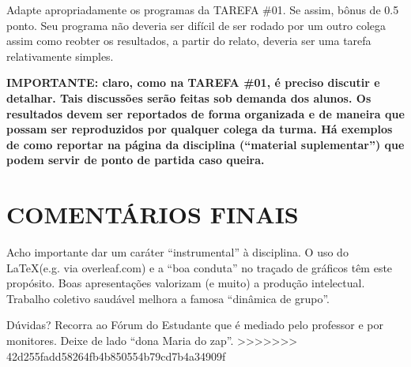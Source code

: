 \documentclass{article}
\begin{document}
\vspace{5mm}


Adapte apropriadamente os programas da TAREFA \#01. Se assim, bônus de 0.5 ponto. Seu programa não deveria ser difícil de ser rodado por um outro colega assim como reobter os resultados, a partir do relato, deveria ser uma tarefa relativamente simples.

\vspace{3mm}\noindent
{\bf IMPORTANTE: claro, como na TAREFA \#01, é preciso discutir e detalhar. Tais discussões serão feitas sob demanda dos alunos. Os resultados devem ser reportados de forma organizada e de maneira que possam ser reproduzidos por qualquer colega da turma. Há exemplos de como reportar na página da disciplina (``material suplementar'') que podem servir de ponto de partida caso queira.}

\section{COMENTÁRIOS FINAIS}
    Acho importante dar um caráter ``instrumental'' à disciplina. O uso do \LaTeX\quad (e.g. via overleaf.com) e a ``boa conduta'' no traçado de gráficos têm este propósito. Boas apresentações valorizam (e muito) a produção intelectual. Trabalho coletivo saudável melhora a famosa ``dinâmica de grupo''. 
    
\vspace{5mm}
Dúvidas? Recorra ao Fórum do Estudante que é mediado pelo professor e por monitores. Deixe de lado ``dona Maria do zap''.
>>>>>>> 42d255fadd58264fb4b850554b79cd7b4a34909f
\end{document}
